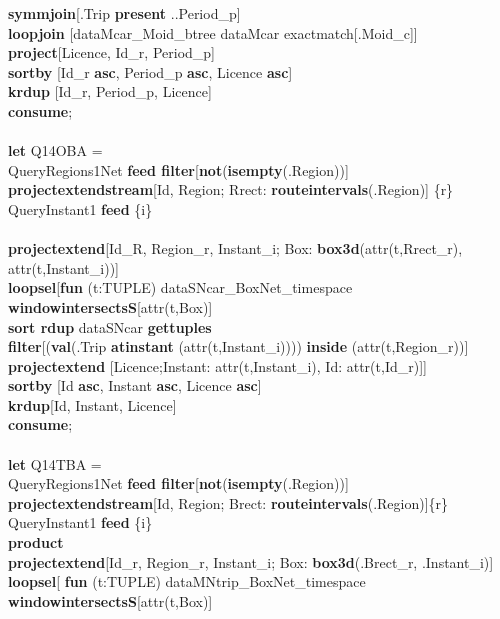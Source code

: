 \documentclass[a4paper]{article}
\newcommand{\op}[1]{\textbf{#1}}
\begin{document}
\begin{scriptsize}
\begin{tabbing}
\>\op{symmjoin}[.Trip \op{present} ..Period\_p]\\
\>\op{loopjoin} [dataMcar\_Moid\_btree dataMcar exactmatch[.Moid\_c]]\\
\>\op{project}[Licence, Id\_r, Period\_p]\\
\>\op{sortby} [Id\_r \op{asc}, Period\_p \op{asc}, Licence \op{asc}]\\
\>\op{krdup} [Id\_r, Period\_p, Licence]\\
\op{consume};\\
\\
\op{let} Q14OBA =\\
\>QueryRegions1Net \op{feed filter}[\op{not}(\op{isempty}(.Region))]\\
\>\op{projectextendstream}[Id, Region; Rrect:  \op{routeintervals}(.Region)]
\{r\}\\
\>QueryInstant1 \op{feed} \{i\}\\
\\
\>\op{projectextend}[Id\_R, Region\_r, Instant\_i; Box:
\op{box3d}(attr(t,Rrect\_r), attr(t,Instant\_i))]\\
\>\op{loopsel}[\op{fun} (t:TUPLE) dataSNcar\_BoxNet\_timespace
\op{windowintersectsS}[attr(t,Box)]\\
\>\>\op{sort rdup} dataSNcar \op{gettuples}\\
\>\>\op{filter}[(\op{val}(.Trip \op{atinstant} (attr(t,Instant\_i))))
\op{inside} (attr(t,Region\_r))]\\
\>\>\op{projectextend} [Licence;Instant: attr(t,Instant\_i), Id:
attr(t,Id\_r)]]\\
\>\op{sortby} [Id \op{asc}, Instant \op{asc}, Licence \op{asc}]\\
\>\op{krdup}[Id, Instant, Licence]\\
\op{consume};\\
\\
\op{let} Q14TBA =\\
\>QueryRegions1Net \op{feed filter}[\op{not}(\op{isempty}(.Region))]\\
\>\>\op{projectextendstream}[Id, Region; Brect:
\op{routeintervals}(.Region)]\{r\}\\
\>QueryInstant1 \op{feed} \{i\}\\
\>\op{product}\\
\>\op{projectextend}[Id\_r, Region\_r, Instant\_i; Box: \op{box3d}(.Brect\_r,
.Instant\_i)]\\
\>\op{loopsel}[ \op{fun} (t:TUPLE) dataMNtrip\_BoxNet\_timespace
\op{windowintersectsS}[attr(t,Box)]\\

\end{tabbing}
\end{scriptsize}
\end{document}
